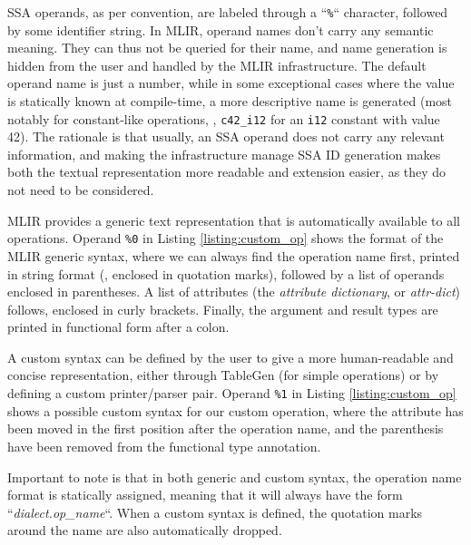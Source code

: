 SSA operands, as per convention, are labeled through a “\texttt{\%}“ character, followed by some identifier string. In MLIR, operand names don’t carry any semantic meaning. They can thus not be queried for their name, and name generation is hidden from the user and handled by the MLIR infrastructure. The default operand name is just a number, while in some exceptional cases where the value is statically known at compile-time, a more descriptive name is generated (most notably for constant-like operations, \eg, \texttt{c42\_i12} for an \texttt{i12} constant with value 42). The rationale is that usually, an SSA operand does not carry any relevant information, and making the infrastructure manage SSA ID generation makes both the textual representation more readable and extension easier, as they do not need to be considered.

MLIR provides a generic text representation that is automatically available to all operations. Operand \texttt{\%0} in Listing \ref{listing:custom_op} shows the format of the MLIR generic syntax, where we can always find the operation name first, printed in string format (\ie, enclosed in quotation marks), followed by a list of operands enclosed in parentheses. A list of attributes (the \textit{attribute dictionary}, or \textit{attr-dict}) follows, enclosed in curly brackets. Finally, the argument and result types are printed in functional form after a colon.

A custom syntax can be defined by the user to give a more human-readable and concise representation, either through TableGen (for simple operations) or by defining a custom printer/parser pair. Operand \texttt{\%1} in Listing \ref{listing:custom_op} shows a possible custom syntax for our custom operation, where the attribute has been moved in the first position after the operation name, and the parenthesis have been removed from the functional type annotation.

Important to note is that in both generic and custom syntax, the operation name format is statically assigned, meaning that it will always have the form “\textit{dialect.op\_name}“. When a custom syntax is defined, the quotation marks around the name are also automatically dropped.



